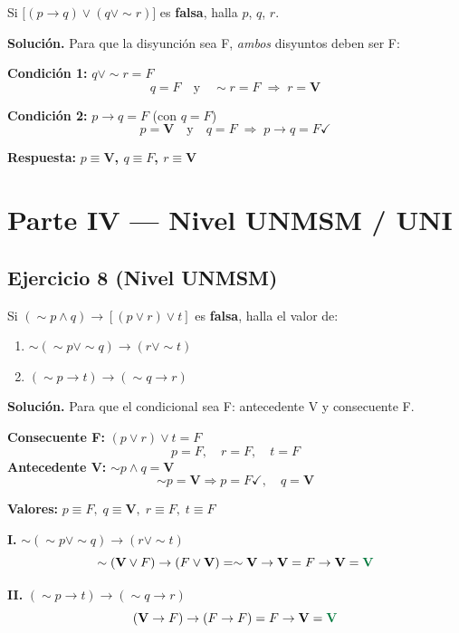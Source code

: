 \documentclass[12pt,a4paper]{article}
\newcommand{\V}{\textbf{V}}
\newcommand{\F}{F}
\newcommand{\resultado}[1]{\textcolor{verde}{\textbf{#1}}}
\begin{document}
\begin{enunciado}
Si $\bigl[(p \rightarrow q) \vee (q \vee \sim r)\bigr]$ es \textbf{falsa}, halla $p$, $q$, $r$.
\end{enunciado}

\begin{solucion}
\textbf{Solución.} Para que la disyunción sea F, \emph{ambos} disyuntos deben ser F:

\textbf{Condición 1:} $q \vee \sim r = \F$
\[
q = \F \quad \text{y} \quad \sim r = \F \;\Rightarrow\; r = \V
\]

\textbf{Condición 2:} $p \rightarrow q = \F$ \quad (con $q = \F$)
\[
p = \V \quad \text{y} \quad q = \F \;\Rightarrow\; p \rightarrow q = \F \checkmark
\]

\textbf{Respuesta:} \resultado{$p \equiv \V$, $q \equiv \F$, $r \equiv \V$}
\end{solucion}

\bigskip

\section{Parte IV — Nivel UNMSM / UNI}

\subsection*{Ejercicio 8 \small(Nivel UNMSM)}

\begin{enunciado}
Si $(\sim p \wedge q) \rightarrow [(p \vee r) \vee t]$ es \textbf{falsa}, halla el valor de:
\begin{enumerate}[label=\Roman*.]
  \item $\sim(\sim p \vee \sim q) \rightarrow (r \vee \sim t)$
  \item $(\sim p \rightarrow t) \rightarrow (\sim q \rightarrow r)$
\end{enumerate}
\end{enunciado}

\begin{solucion}
\textbf{Solución.} Para que el condicional sea F: antecedente V y consecuente F.

\textbf{Consecuente F:} $(p \vee r) \vee t = \F$
\[
p = \F,\quad r = \F,\quad t = \F
\]
\textbf{Antecedente V:} $\sim p \wedge q = \V$
\[
\sim p = \V \Rightarrow p = \F \checkmark, \quad q = \V
\]

\textbf{Valores:} $p \equiv \F,\; q \equiv \V,\; r \equiv \F,\; t \equiv \F$

\medskip
\textbf{I.} $\sim(\sim p \vee \sim q) \rightarrow (r \vee \sim t)$
\[
\sim(\V \vee \F) \rightarrow (\F \vee \V)
= \sim\V \rightarrow \V
= \F \rightarrow \V = \resultado{V}
\]

\textbf{II.} $(\sim p \rightarrow t) \rightarrow (\sim q \rightarrow r)$
\[
(\V \rightarrow \F) \rightarrow (\F \rightarrow \F)
= \F \rightarrow \V = \resultado{V}
\]
\end{solucion}
\end{document}
